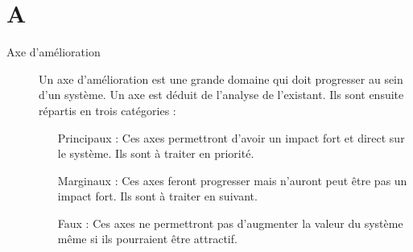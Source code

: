\section{A}

\begin{description}

\item[Axe d'amélioration] Un axe d'amélioration est une grande domaine qui doit progresser au sein d'un système. Un axe est déduit de l'analyse de
 l'existant. Ils sont ensuite répartis en trois catégories : 

\begin{itemize}
\item[Principaux] : Ces axes permettront d'avoir un impact fort et direct sur le système. Ils sont à traiter en priorité.
\item[Marginaux] : Ces axes feront progresser mais n'auront peut être pas un impact fort. Ils sont à traiter en suivant.
\item[Faux] : Ces axes ne permettront pas d'augmenter la valeur du système même si ils pourraient être attractif.
\end{itemize} 

\end{description}

